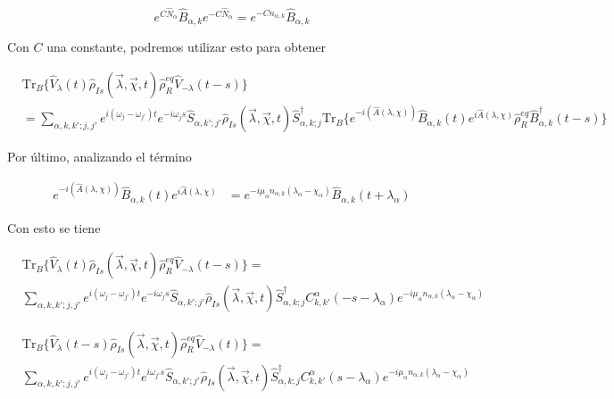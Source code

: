 \begin{appendixs}
\begin{equation*}
    e^{C\hat{N}_{\alpha}}\hat{B}_{\alpha,k}e^{-C\hat{N}_{\alpha}} = e^{-Cn_{\alpha,k}}\hat{B}_{\alpha,k} 
\end{equation*}

Con $C$ una constante, podremos utilizar esto para obtener

\begin{align*}
   & \text{Tr}_{B}\{ \hat{V}_{\lambda}(t)\hat{\rho}_{Is}(\vec{\lambda},\vec{\chi},t)\hat{\rho}_{R}^{eq}\hat{V}_{-\lambda}(t-s) \} \\
   & = \sum_{\alpha,k,k';j,j'}e^{i(\omega_{j}-\omega_{j'})t}e^{-i\omega_{j}s}\hat{S}_{\alpha,k';j'}\hat{\rho}_{Is}(\vec{\lambda},\vec{\chi},t)\hat{S}^{\dagger}_{\alpha,k;j} \text{Tr}_{B}\{e^{-i(\hat{A}(\lambda,\chi))} \hat{B}_{\alpha,k}(t)e^{i\hat{A}(\lambda,\chi)}\hat{\rho}_{R}^{eq}\hat{B}^{\dagger}_{\alpha,k}(t-s) \}
\end{align*}

Por último, analizando el término

\begin{align*}
    e^{-i(\hat{A}(\lambda,\chi))} \hat{B}_{\alpha,k}(t)e^{i\hat{A}(\lambda,\chi)} & = e^{-i\mu_{\alpha}n_{\alpha,k}(\lambda_{\alpha}-\chi_{\alpha})} \hat{B}_{\alpha,k}(t+\lambda_{\alpha}) 
\end{align*}

Con esto se tiene

\begin{align*}
 & \text{Tr}_{B}\{ \hat{V}_{\lambda}(t)\hat{\rho}_{Is}(\vec{\lambda},\vec{\chi},t)\hat{\rho}_{R}^{eq}\hat{V}_{-\lambda}(t-s) \} = \\
 & \sum_{\alpha,k,k';j,j'}e^{i(\omega_{j}-\omega_{j'})t}e^{-i\omega_{j}s}\hat{S}_{\alpha,k';j'}\hat{\rho}_{Is}(\vec{\lambda},\vec{\chi},t)\hat{S}^{\dagger}_{\alpha,k;j} C^{\alpha}_{k,k'}(-s-\lambda_{\alpha})e^{-i\mu_{\alpha}n_{\alpha,k}(\lambda_{\alpha}-\chi_{\alpha})}
 \end{align*}

 \begin{align*}
    & \text{Tr}_{B}\{ \hat{V}_{\lambda}(t-s)\hat{\rho}_{Is}(\vec{\lambda},\vec{\chi},t)\hat{\rho}_{R}^{eq}\hat{V}_{-\lambda}(t) \} = \\
    & \sum_{\alpha,k,k';j,j'}e^{i(\omega_{j}-\omega_{j'})t}e^{i\omega_{j'}s}\hat{S}_{\alpha,k';j'}\hat{\rho}_{Is}(\vec{\lambda},\vec{\chi},t)\hat{S}^{\dagger}_{\alpha,k;j} C^{\alpha}_{k,k'}(s-\lambda_{\alpha})e^{-i\mu_{\alpha}n_{\alpha,k}(\lambda_{\alpha}-\chi_{\alpha})}
    \end{align*}
   

\end{appendixs}
